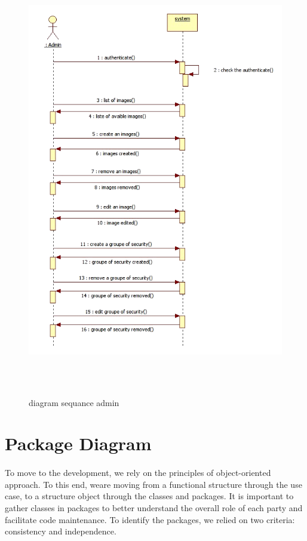 \begin{figure}[!h]
 \center
 \includegraphics[width=16cm, height=19cm]{./images/design/sequenceadmin}
 \caption{diagram sequance admin}
\end{figure}

\clearpage

\section{Package Diagram}



\paragraph{}To move to the development, we rely on the principles of object-oriented approach. To this end, weare moving from a functional structure through the 
use case, to a structure object through the classes and packages. It is important to gather classes in packages to better understand the overall role of each
party and facilitate code maintenance. To identify the packages, we relied on two criteria: consistency and independence.

